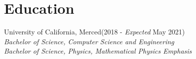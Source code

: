 \documentclass[./Resume.tex]{subfiles}
\begin{document}
\section{Education}
University of California, Merced\null\hfill(2018 - \emph{Expected} May 2021)\\
		   \emph{Bachelor of Science, Computer Science and Engineering}\\
		   \emph{Bachelor of Science, Physics, Mathematical Physics Emphasis}
\end{document}
